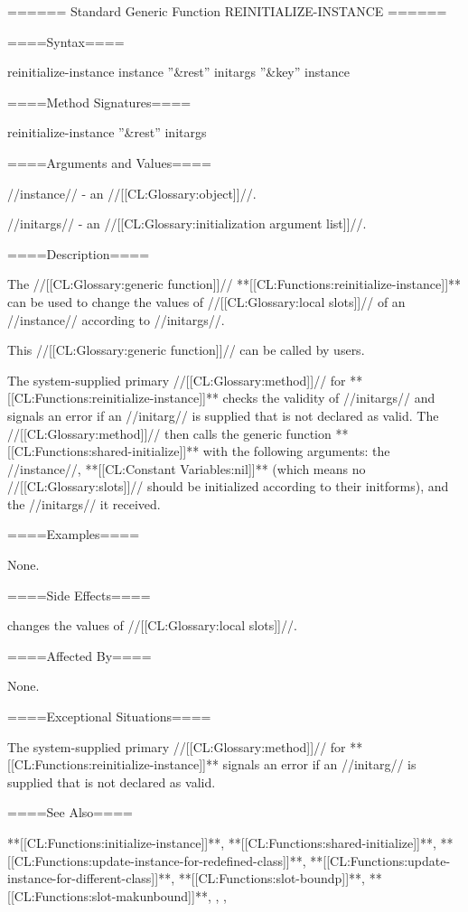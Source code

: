 ====== Standard Generic Function REINITIALIZE-INSTANCE ======

====Syntax====


\DefgenWithValues reinitialize-instance {instance ''&rest'' initargs ''&key'' {\allowotherkeys}} {instance}

====Method Signatures====

\Defmeth reinitialize-instance { ''&rest'' initargs}

====Arguments and Values====

//instance// - an //[[CL:Glossary:object]]//.

//initargs// - an //[[CL:Glossary:initialization argument list]]//.

====Description====

The //[[CL:Glossary:generic function]]// **[[CL:Functions:reinitialize-instance]]** can be used to change the values of //[[CL:Glossary:local slots]]// of an //instance// according to //initargs//.

This //[[CL:Glossary:generic function]]// can be called by users.

The system-supplied primary //[[CL:Glossary:method]]// for **[[CL:Functions:reinitialize-instance]]** checks the validity of //initargs// and signals an error if an //initarg// is supplied that is not declared as valid. The //[[CL:Glossary:method]]// then calls the generic function **[[CL:Functions:shared-initialize]]** with the following arguments: the //instance//, **[[CL:Constant Variables:nil]]** (which means no //[[CL:Glossary:slots]]// should be initialized according to their initforms), and the //initargs// it received.

====Examples====

None.

====Side Effects====

 changes the values of //[[CL:Glossary:local slots]]//.

====Affected By====

None.

====Exceptional Situations====

The system-supplied primary //[[CL:Glossary:method]]// for **[[CL:Functions:reinitialize-instance]]** signals an error if an //initarg// is supplied that is not declared as valid.

====See Also====

**[[CL:Functions:initialize-instance]]**, **[[CL:Functions:shared-initialize]]**, **[[CL:Functions:update-instance-for-redefined-class]]**, **[[CL:Functions:update-instance-for-different-class]]**, **[[CL:Functions:slot-boundp]]**, **[[CL:Functions:slot-makunbound]]**, {\secref\InstanceReInit}, {\secref\InitargRules}, {\secref\DeclaringInitargValidity}


